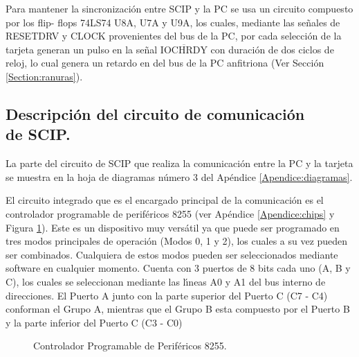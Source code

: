 Para mantener la sincronizaci\'on entre SCIP y la PC se usa un circuito compuesto por los flip-%
flops 74LS74 U8A, U7A y U9A, los cuales, mediante las se\~nales de RESETDRV y CLOCK provenientes %
del bus de la PC, por cada selecci\'on de la tarjeta generan un pulso en la se\~nal %
$\overline{\mbox{IOCHRDY}}$ con duraci\'on de dos ciclos de reloj, lo cual genera un %
retardo en del bus de la PC anfitriona (Ver Secci\'on \ref{Section:ranuras}).


\subsection{Des\-crip\-ci\-\'on del cir\-cui\-to de comunicaci\'on\\de SCIP.}
\label{Subsection:comunicacion}

La parte del circuito de SCIP que realiza la comunicaci\'on entre la PC y la tarjeta se muestra %
en la hoja de diagramas n\'umero 3 del  Ap\'endice \ref{Apendice:diagramas}.

El circuito integrado que es el encargado principal de la comunicaci\'on es el controlador %
programable de perif\'ericos 8255 (ver Ap\'endice \ref{Apendice:chips} y Figura %
\ref{Figura:8255}). Este es un dispositivo muy vers\'atil ya que puede ser programado en tres %
modos principales de operaci\'on (Modos 0, 1 y 2), los cuales a su vez pueden ser combinados. %
Cualquiera de estos modos pueden ser seleccionados mediante software en cualquier momento. %
Cuenta con 3 puertos de 8 bits cada uno (A, B y C), los cuales se seleccionan mediante las %
l\'{\i}neas A0 y A1 del bus interno de direcciones. El Puerto A junto con la parte superior del %
Puerto C (C7 - C4) conforman el Grupo A, mientras que el Grupo B esta compuesto por el Puerto B %
y la parte inferior del Puerto C (C3 - C0)

\vspace{12pt}

\begin{figure}[!htb]
\vskip 5mm
\vskip 80mm
\caption{Controlador Programable de Perif\'ericos 8255.} 
\label{Figura:8255}
\end{figure}

\vspace{12pt}

